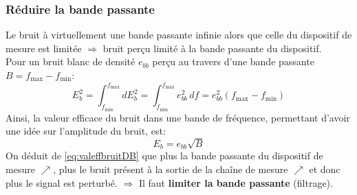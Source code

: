 \subsubsection{Réduire la bande passante} \label{subsubsec:bandepass}
Le bruit à virtuellement une bande passante infinie alors que celle du dispositif de mesure est limitée \(\Rightarrow\) bruit perçu limité à la bande passante du dispositif.\\

Pour un bruit blanc de densité \(e_{bb}\) perçu au travers d'une bande passante \(B=f_{\text{max}}-f_{\text{min}}\):
\begin{equation}
E_b^2 = \int_{f_{\text{min}}}^{f_{\text{max}}} dE_b^2 = \int_{f_{\text{min}}}^{f_{\text{max}}} e_{bb}^2\,df = e_{bb}^2(f_{\text{max}}-f_{\text{min}}) 
\end{equation}
Ainsi, la valeur efficace du bruit dans une bande de fréquence, permettant d'avoir une idée sur l'amplitude du bruit, est:
\begin{equation}\label{eq:valeffbruitDB}
E_b = e_{bb}\sqrt{B}
\end{equation}
On déduit de \eqref{eq:valeffbruitDB} que plus la bande passante du dispositif de mesure \(\nearrow\), plus le bruit présent à la sortie de la chaîne de mesure \(\nearrow\) et donc plus le signal est perturbé. \(\Rightarrow\) Il faut \textbf{limiter la bande passante} (filtrage).\\

